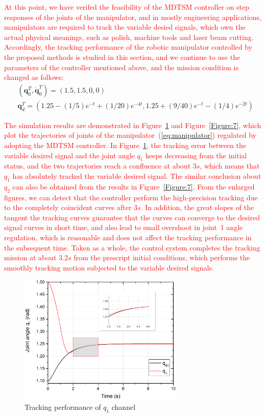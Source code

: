\documentclass[3p]{elsarticle}
\theoremstyle{plain}
\theoremstyle{remark}
\begin{document}
\textcolor{red}{At this point, we have verifed the feasibility of the MDTSM controller on step responses of the joints of the manipulator, and in mostly engineering applications, manipulators are required to track the variable desied signals, which own the actual physical meanings, such as polish, machine tools and laser beam cutting. Accordingly, the tracking performance of the robotic manipulator controlled by the proposed methods is studied in this section, and we continue to use the parameters of the controller mentioned above, and the mission condition is changed as follows:}
\begin{align*}
&(\bm q_0^T, \dot{\bm q}_0^T)= (1.5,1.5,0,0)\\
&{\bm q}_d^T=(1.25-(1/5)e^{-t}+(1/20)e^{-4t},1.25+(9/40)e^{-t}-(1/4)e^{-2t})
\end{align*}\par
 \textcolor{red}{The simulation results are demonstrated in Figure~\ref{Figure:6} and Figure~\ref{Figure:7}, which plot the trajectories of joints of the manipulator~(\ref{eq:manipulator}) regulated by adopting the MDTSM controller. In Figure~\ref{Figure:6}, the tracking error between the variable desired signal and the joint angle $q_1$ keeps decreasing from the initial status, and the two trajectories reach a confluence at about $3s$, which means that $q_1$ has absolutely tracked the variable desired signal. The similar conclusion about $q_2$ can also be obtained from the results in Figure~\ref{Figure:7}. From the enlarged figures, we can detect that the controller perform the high-precision tracking due to the completely coincident curves after $3s$. In addition, the great slopes of the tangent the tracking curves guarantee that the curves can converge to the desired signal curves in short time, and also lead to small overshoot in joint~1 angle regulation, which is reasonable and does not affect the tracking performance in the subsequent time. Taken as a whole, the control system completes the tracking mission at about $3.2s$ from the prescript initial conditions, which performs the smoothly tracking motion subjected to the variable desired signals.}
\begin{figure}
\centering
\includegraphics[width=0.7\textwidth]{paper3_fig6.eps}
\caption{Tracking performance of $q_1$ channel}
\label{Figure:6}
\end{figure}
\end{document}
